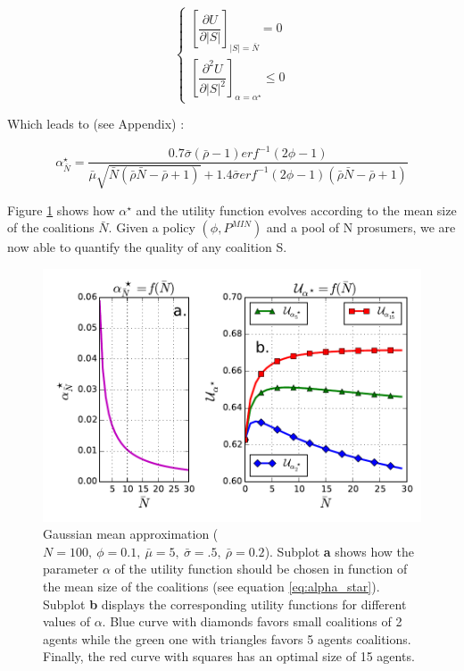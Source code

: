 \documentclass[journal]{IEEEtran}
\begin{document}
\begin{equation}
\left\{ \begin{array}{lll}
	          \left[ \dfrac{\partial{ U}}{ \partial{|S|}} \right]_{|S| = \bar{N}} = 0 \\
	          \left[ \dfrac{\partial^2 U}{\partial |S|^2} \right]_{ \alpha = \alpha^{\star} } \leq 0
	    \end{array} 
\right.
\label{eq:derivative}
\end{equation}

Which leads to (see Appendix) :

\footnotesize
\begin{equation}
\alpha^{\star}_{\bar{N}} = \dfrac{0.7 \bar{\sigma}(\bar{\rho}-1)erf^{-1}(2 \phi - 1)}{\bar{\mu}\sqrt{\bar{N}(\bar{\rho}\bar{N}-\bar{\rho}+1)}+1.4 \bar{\sigma} erf^{-1} (2 \phi -1 ) (\bar{\rho}\bar{N}-\bar{\rho} + 1)} 
\label{eq:alpha_star}
\end{equation}
\normalsize

Figure \ref{fig:mean_approx} shows how $ \alpha^{\star} $ and the utility function evolves according to the mean size of the coalitions $ \bar{N} $. Given a policy $ (\phi, P^{MIN} ) $ and a pool of N prosumers, we are now able to quantify the quality of any coalition S.


\begin{figure}
	\begin{center}
		\includegraphics[scale=.46]{./figs/figure_2}
		\caption{{\footnotesize Gaussian mean approximation ($N=100,\ \phi=0.1,\ \bar{\mu}=5,\ \bar{\sigma}=.5,\ \bar{\rho}=0.2 $). Subplot \textbf{a} shows how the parameter $ \alpha $ of the utility function should be chosen in function of the mean size of the coalitions (see equation \ref{eq:alpha_star}). Subplot \textbf{b} displays the corresponding utility functions for different values of $ \alpha $. Blue curve with diamonds favors small coalitions of 2 agents while the green one with triangles favors 5 agents coalitions. Finally, the red curve with squares has an optimal size of 15 agents.} }
		\label{fig:mean_approx}
	\end{center}
\end{figure}
\end{document}
